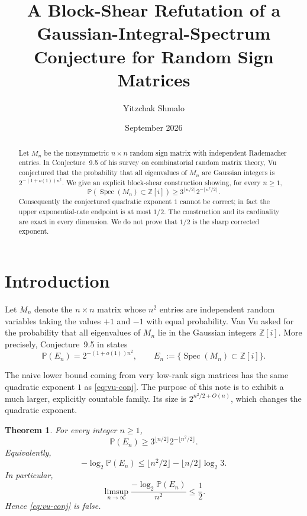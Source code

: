 \documentclass[11pt]{article}
\title{A Block-Shear Refutation of a Gaussian-Integral-Spectrum Conjecture for Random Sign Matrices}
\author{Yitzchak Shmalo}
\date{September 2026}
\newtheorem{theorem}{Theorem}
\theoremstyle{remark}
\newcommand{\Z}{\mathbb Z}
\newcommand{\Pp}{\mathbb P}
\newcommand{\Spec}{\operatorname{Spec}}
\begin{document}
\maketitle

\begin{abstract}
Let $M_n$ be the nonsymmetric $n\times n$ random sign matrix with independent Rademacher entries.  In Conjecture~9.5 of his survey on combinatorial random matrix theory, Vu conjectured that the probability that all eigenvalues of $M_n$ are Gaussian integers is $2^{-(1+o(1))n^2}$.  We give an explicit block-shear construction showing, for every $n\ge1$,
\[
 \Pp\!\left(\Spec(M_n)\subset \Z[i]\right)
 \ge 3^{\lfloor n/2\rfloor}2^{-\lfloor n^2/2\rfloor}.
\]
Consequently the conjectured quadratic exponent $1$ cannot be correct; in fact the upper exponential-rate endpoint is at most $1/2$.  The construction and its cardinality are exact in every dimension.  We do not prove that $1/2$ is the sharp corrected exponent.
\end{abstract}

\section{Introduction}

Let $M_n$ denote the $n\times n$ matrix whose $n^2$ entries are independent random variables taking the values $+1$ and $-1$ with equal probability.  Van Vu asked for the probability that all eigenvalues of $M_n$ lie in the Gaussian integers $\Z[i]$.  More precisely, Conjecture~9.5 in \cite{Vu2021} states
\begin{equation}\label{eq:vu-conj}
 \Pp(E_n)=2^{-(1+o(1))n^2},
 \qquad
 E_n:=\{\Spec(M_n)\subset \Z[i]\}.
\end{equation}

The naive lower bound coming from very low-rank sign matrices has the same quadratic exponent $1$ as \eqref{eq:vu-conj}.  The purpose of this note is to exhibit a much larger, explicitly countable family.  Its size is $2^{n^2/2+O(n)}$, which changes the quadratic exponent.

\begin{theorem}\label{thm:main}
For every integer $n\ge1$,
\begin{equation}\label{eq:main-lower}
 \Pp(E_n)
 \ge
 3^{\lfloor n/2\rfloor}2^{-\lfloor n^2/2\rfloor}.
\end{equation}
Equivalently,
\[
 -\log_2 \Pp(E_n)
 \le
 \lfloor n^2/2\rfloor-\lfloor n/2\rfloor\log_2 3.
\]
In particular,
\begin{equation}\label{eq:limsup}
 \limsup_{n\to\infty}
 \frac{-\log_2\Pp(E_n)}{n^2}
 \le \frac12.
\end{equation}
Hence \eqref{eq:vu-conj} is false.
\end{theorem}
\end{document}
